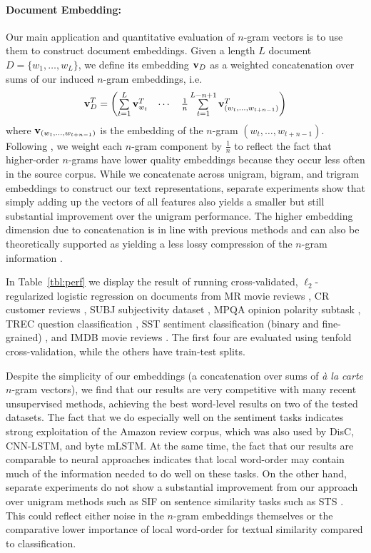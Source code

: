 \documentclass[11pt,a4paper]{article}
\begin{document}
\paragraph{Document Embedding:}
Our main application and quantitative evaluation of $n$-gram vectors is to use them to construct document embeddings.
Given a length $L$ document $D=\{w_1,\dots,w_L\}$, we define its embedding ${\bf v}_D$ as a weighted concatenation over sums of our induced $n$-gram embeddings, i.e.
\begin{equation*}
{\bf v}_D^T=\begin{pmatrix}\sum\limits_{t=1}^L{\bf v}_{w_t}^T&\cdots&\frac{1}{n}\sum\limits_{t=1}^{L-n+1}{\bf v}_{(w_t,\dots,w_{t+n-1})}^T\end{pmatrix}
\end{equation*}
where ${\bf v}_{(w_t,\dots,w_{t+n-1})}$ is the embedding of the $n$-gram $(w_t,\dots,w_{t+n-1})$.
Following \citet{Arora:18a}, we weight each $n$-gram component by $\frac{1}{n}$ to reflect the fact that higher-order $n$-grams have lower quality embeddings because they occur less often in the source corpus.
While we concatenate across unigram, bigram, and trigram embeddings to construct our text representations, separate experiments show that simply adding up the vectors of all features also yields a smaller but still substantial improvement over the unigram performance.
The higher embedding dimension due to concatenation is in line with previous methods and can also be theoretically supported as yielding a less lossy compression of the $n$-gram information \cite{Arora:18a}.

In Table~\ref{tbl:perf} we display the result of running cross-validated, $\ell_2$-regularized logistic regression on documents from MR movie reviews \citep{Pang:05}, CR customer reviews \citep{Hu:04}, SUBJ subjectivity dataset \citep{Pang:04}, MPQA opinion polarity subtask \citep{Wiebe:05}, TREC question classification \citep{Li:02}, SST sentiment classification (binary and fine-grained) \citep{Socher:13}, and IMDB movie reviews \citep{Maas:11}.
The first four are evaluated using tenfold cross-validation, while the others have train-test splits.

Despite the simplicity of our embeddings (a concatenation over sums of {\em\` a la carte} $n$-gram vectors), we find that our results are very competitive with many recent unsupervised methods, achieving the best word-level results on two of the tested datasets.
The fact that we do especially well on the sentiment tasks indicates strong exploitation of the Amazon review corpus, which was also used by DisC, CNN-LSTM, and byte mLSTM.
At the same time, the fact that our results are comparable to neural approaches indicates that local word-order may contain much of the information needed to do well on these tasks.
On the other hand, separate experiments do not show a substantial improvement from our approach over unigram methods such as SIF \cite{Arora:17} on sentence similarity tasks such as STS \cite{Cer:17}.
This could reflect either noise in the $n$-gram embeddings themselves or the comparative lower importance of local word-order for textual similarity compared to classification. 
\end{document}
